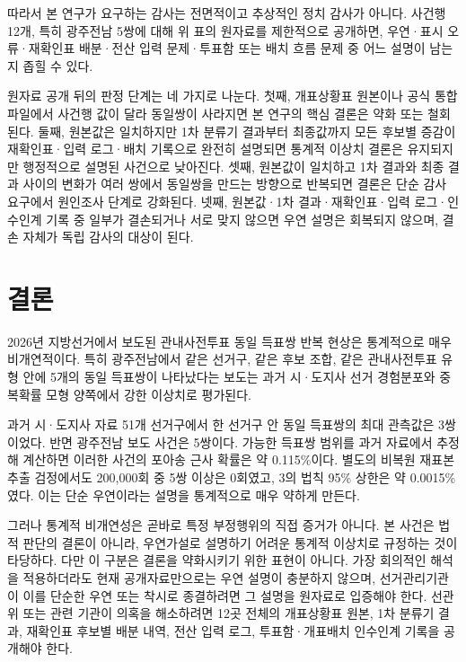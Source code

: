 \documentclass[preprint]{IEIE}
\begin{document}
따라서 본 연구가 요구하는 감사는 전면적이고 추상적인 정치 감사가 아니다. 사건행 12개, 특히 광주전남 5쌍에 대해 위 표의 원자료를 제한적으로 공개하면, 우연·표시 오류·재확인표 배분·전산 입력 문제·투표함 또는 배치 흐름 문제 중 어느 설명이 남는지 좁힐 수 있다.

원자료 공개 뒤의 판정 단계는 네 가지로 나눈다. 첫째, 개표상황표 원본이나 공식 통합 파일에서 사건행 값이 달라 동일쌍이 사라지면 본 연구의 핵심 결론은 약화 또는 철회된다. 둘째, 원본값은 일치하지만 1차 분류기 결과부터 최종값까지 모든 후보별 증감이 재확인표·입력 로그·배치 기록으로 완전히 설명되면 통계적 이상치 결론은 유지되지만 행정적으로 설명된 사건으로 낮아진다. 셋째, 원본값이 일치하고 1차 결과와 최종 결과 사이의 변화가 여러 쌍에서 동일쌍을 만드는 방향으로 반복되면 결론은 단순 감사 요구에서 원인조사 단계로 강화된다. 넷째, 원본값·1차 결과·재확인표·입력 로그·인수인계 기록 중 일부가 결손되거나 서로 맞지 않으면 우연 설명은 회복되지 않으며, 결손 자체가 독립 감사의 대상이 된다.

\section{결론}

2026년 지방선거에서 보도된 관내사전투표 동일 득표쌍 반복 현상은 통계적으로 매우 비개연적이다. 특히 광주전남에서 같은 선거구, 같은 후보 조합, 같은 관내사전투표 유형 안에 5개의 동일 득표쌍이 나타났다는 보도는 과거 시·도지사 선거 경험분포와 중복확률 모형 양쪽에서 강한 이상치로 평가된다.

과거 시·도지사 자료 51개 선거구에서 한 선거구 안 동일 득표쌍의 최대 관측값은 3쌍이었다. 반면 광주전남 보도 사건은 5쌍이다. 가능한 득표쌍 범위를 과거 자료에서 추정해 계산하면 이러한 사건의 포아송 근사 확률은 약 0.115\%이다. 별도의 비복원 재표본추출 검정에서도 200,000회 중 5쌍 이상은 0회였고, 3의 법칙 95\% 상한은 약 0.0015\%였다. 이는 단순 우연이라는 설명을 통계적으로 매우 약하게 만든다.

그러나 통계적 비개연성은 곧바로 특정 부정행위의 직접 증거가 아니다. 본 사건은 법적 판단의 결론이 아니라, 우연가설로 설명하기 어려운 통계적 이상치로 규정하는 것이 타당하다. 다만 이 구분은 결론을 약화시키기 위한 표현이 아니다. 가장 회의적인 해석을 적용하더라도 현재 공개자료만으로는 우연 설명이 충분하지 않으며, 선거관리기관이 이를 단순한 우연 또는 착시로 종결하려면 그 설명을 원자료로 입증해야 한다. 선관위 또는 관련 기관이 의혹을 해소하려면 12곳 전체의 개표상황표 원본, 1차 분류기 결과, 재확인표 후보별 배분 내역, 전산 입력 로그, 투표함·개표배치 인수인계 기록을 공개해야 한다.
\end{document}

